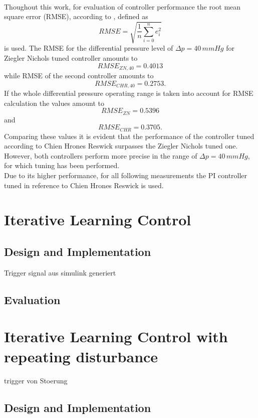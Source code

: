 \\Thoughout this work, for evaluation of controller performance the root mean square error (RMSE), according to \cite{RMSE}, defined as
\begin{equation}
  RMSE = \sqrt{\frac{1}{n}\sum_{i=0}^n e_i^2}
\end{equation}
is used. The RMSE for the differential pressure level of $\Delta{p}=40\,mmHg$ for Ziegler Nichols tuned controller amounts to
\begin{equation}
  RMSE_{ZN,40}=0.4013
\end{equation}
while RMSE of the second controller amounts to
\begin{equation}
  RMSE_{CHR,40}=0.2753.
\end{equation}
If the whole differential pressure operating range is taken into account for RMSE calculation the values amount to
\begin{equation}
  RMSE_{ZN}=0.5396
\end{equation}
and
\begin{equation}
  RMSE_{CHR}=0.3705.
\end{equation}
Comparing these values it is evident that the performance of the controller tuned according to Chien Hrones Reswick surpasses the Ziegler Nichols tuned one. However, both controllers perform more precise in the range of $\Delta{p}=40\,mmHg$, for which tuning has been performed.
\\ Due to its higher performance, for all following measurements the PI controller tuned in reference to Chien Hrones Reswick is used.
\section{Iterative Learning Control}
\subsection{Design and Implementation}
Trigger signal aus simulink generiert
\subsection{Evaluation}

\section{Iterative Learning Control with repeating disturbance}
trigger von Stoerung
\subsection{Design and Implementation}


